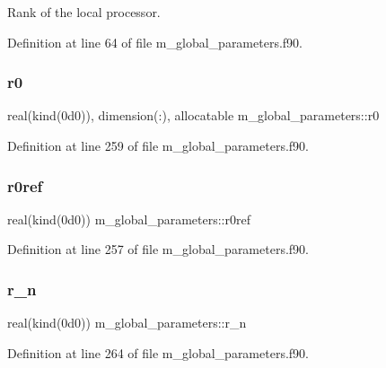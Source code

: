 Rank of the local processor. 



Definition at line 64 of file m\+\_\+global\+\_\+parameters.\+f90.

\mbox{\label{namespacem__global__parameters_a585a72037bbffe12e8d4512a57f52418}} 
\subsubsection{\texorpdfstring{r0}{r0}}
{\footnotesize\ttfamily real(kind(0d0)), dimension(\+:), allocatable m\+\_\+global\+\_\+parameters\+::r0}



Definition at line 259 of file m\+\_\+global\+\_\+parameters.\+f90.

\mbox{\label{namespacem__global__parameters_a24492f9b474683476a342e7ee42c1c6d}} 
\subsubsection{\texorpdfstring{r0ref}{r0ref}}
{\footnotesize\ttfamily real(kind(0d0)) m\+\_\+global\+\_\+parameters\+::r0ref}



Definition at line 257 of file m\+\_\+global\+\_\+parameters.\+f90.

\mbox{\label{namespacem__global__parameters_ae818e88601b1dc579a87e7c0c8cd87cb}} 
\subsubsection{\texorpdfstring{r\+\_\+n}{r\_n}}
{\footnotesize\ttfamily real(kind(0d0)) m\+\_\+global\+\_\+parameters\+::r\+\_\+n}



Definition at line 264 of file m\+\_\+global\+\_\+parameters.\+f90.

